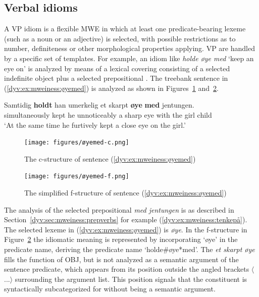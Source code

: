 \documentclass[output=paper]{langsci/langscibook}
\begin{document}
\subsection{Verbal idioms}\label{dyv:sec:mweiness:verbalidioms}

A VP idiom is a flexible MWE in which at least one predicate-bearing lexeme (such as a noun or an adjective) is selected, with possible restrictions as to number, definiteness or other morphological properties applying.
VP  are handled by a specific set of templates.
For example, an idiom like \textit{holde øye med} `keep an eye on' is analyzed by means of a lexical  covering  consisting of a selected indefinite object plus a selected prepositional .
The treebank sentence in (\ref{dyv:ex:mweiness:øyemed}) is analyzed as shown in Figures~\ref{dyv:fig:mweiness:øyemed-c} and~\ref{dyv:fig:mweiness:øyemed-f}.

\ea\label{dyv:ex:mweiness:øyemed}
\gll Samtidig \textbf{holdt} han umerkelig et skarpt \textbf{øye} \textbf{med} jentungen. \\
     simultaneously kept he unnoticeably a sharp eye with {the girl child}\\
\glt `At the same time he furtively kept a close eye on the girl.'
\z


\begin{figure}
  \texttt{[image: figures/øyemed-c.png]}
  \caption{The c-structure of sentence (\ref{dyv:ex:mweiness:øyemed}) }
  \label{dyv:fig:mweiness:øyemed-c}
\end{figure}

\begin{figure}
  \texttt{[image: figures/øyemed-f.png]}
  \caption{The simplified f-structure of sentence (\ref{dyv:ex:mweiness:øyemed}) }
  \label{dyv:fig:mweiness:øyemed-f}
\end{figure}

The analysis of the selected prepositional  \textit{med jentungen} is as described in Section~\ref{dyv:sec:mweiness:prepverbs} for example (\ref{dyv:ex:mweiness:tenkepå}).
The selected lexeme in (\ref{dyv:ex:mweiness:øyemed}) is \textit{øye}.
In the f-structure in Figure~\ref{dyv:fig:mweiness:øyemed-f} the idiomatic meaning is represented by incorporating `øye' in the predicate name, deriving the predicate name `holde\#øye*med'. %
The  \textit{et skarpt øye} fills the function of OBJ, but is not analyzed as a semantic argument of the sentence predicate, which appears from its position outside the angled brackets $\langle$...$\rangle$ surrounding the argument list.
This position signals that the constituent is syntactically subcategorized for without being a semantic argument.
\end{document}
